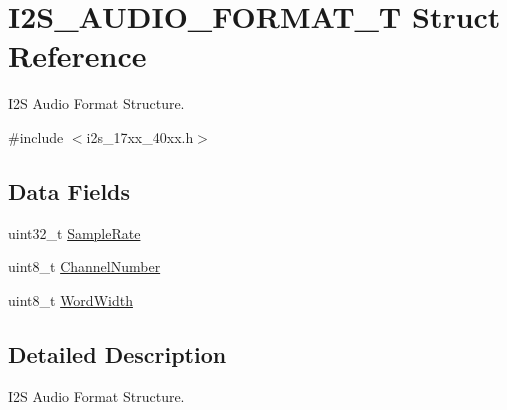 \hypertarget{structI2S__AUDIO__FORMAT__T}{\section{I2\-S\-\_\-\-A\-U\-D\-I\-O\-\_\-\-F\-O\-R\-M\-A\-T\-\_\-\-T Struct Reference}
\label{structI2S__AUDIO__FORMAT__T}
}


I2\-S Audio Format Structure.  




{\ttfamily \#include $<$i2s\-\_\-17xx\-\_\-40xx.\-h$>$}

\subsection*{Data Fields}
\begin{DoxyCompactItemize}
\item 
uint32\-\_\-t \hyperlink{structI2S__AUDIO__FORMAT__T_aef370fad5b70b5226a2f8a780bd934d9}{Sample\-Rate}
\item 
uint8\-\_\-t \hyperlink{structI2S__AUDIO__FORMAT__T_ad9856c3cfc176a9c5f25851dda4d848d}{Channel\-Number}
\item 
uint8\-\_\-t \hyperlink{structI2S__AUDIO__FORMAT__T_a5b21d5d739e0eb7e66c898618fcd4605}{Word\-Width}
\end{DoxyCompactItemize}


\subsection{Detailed Description}
I2\-S Audio Format Structure. 


